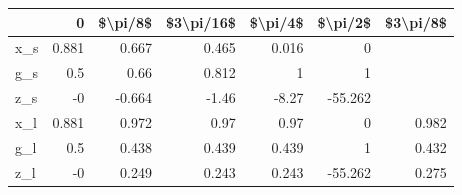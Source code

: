 \begin{tabular}{lrrrrrr}
\hline
     &      0 &   \$\textbackslash{}pi/8\$ &   \$3\textbackslash{}pi/16\$ &   \$\textbackslash{}pi/4\$ &   \$\textbackslash{}pi/2\$ &   \$3\textbackslash{}pi/8\$ \\
\hline
 x\_s &  0.881 &     0.667 &       0.465 &     0.016 &     0     &            \\
 g\_s &  0.5   &     0.66  &       0.812 &     1     &     1     &            \\
 z\_s & -0     &    -0.664 &      -1.46  &    -8.27  &   -55.262 &            \\
 x\_l &  0.881 &     0.972 &       0.97  &     0.97  &     0     &      0.982 \\
 g\_l &  0.5   &     0.438 &       0.439 &     0.439 &     1     &      0.432 \\
 z\_l & -0     &     0.249 &       0.243 &     0.243 &   -55.262 &      0.275 \\
\hline
\end{tabular}